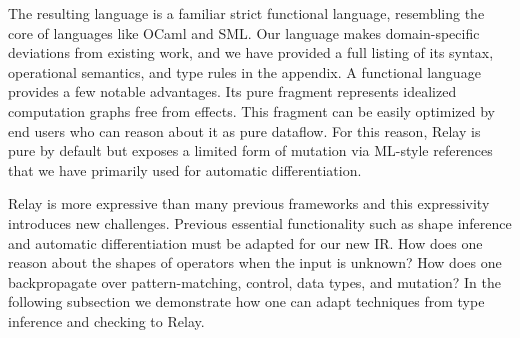  The resulting language is a familiar strict functional language,
    resembling the core of languages like OCaml and SML.
  Our language makes domain-specific deviations from existing work,
    and we have provided a full listing
    of its syntax, operational semantics, and type rules
    in the appendix.
  A functional language provides a few notable advantages.
  Its pure fragment represents idealized computation graphs free
    from effects. This fragment can be easily optimized by end users who
    can reason about it as pure dataflow.
  For this reason, Relay is pure by default but exposes a limited
    form of mutation via ML-style references that we have
    primarily used for automatic differentiation.

  Relay is more expressive than many previous frameworks and this expressivity introduces new challenges.
    Previous essential functionality such
     as shape inference and automatic differentiation must be adapted for
     our new IR.
  How does one reason about the shapes of operators when the input is unknown?
  How does one backpropagate over pattern-matching, control, data types, and mutation?
  In the following subsection we demonstrate how one can adapt techniques
    from type inference and checking to Relay.







